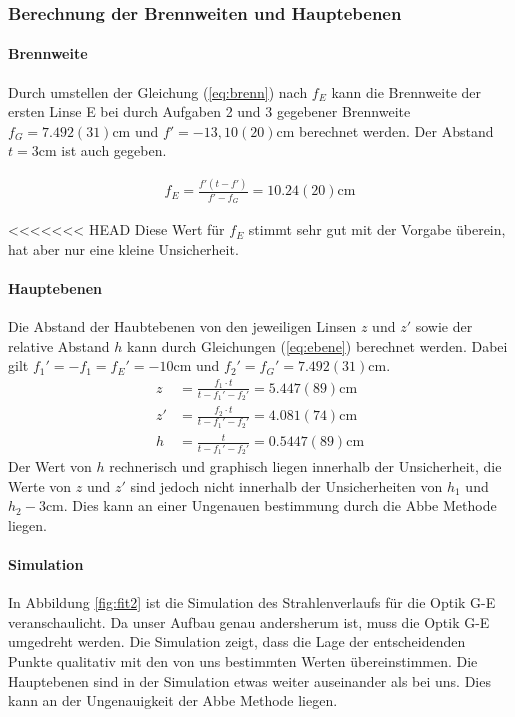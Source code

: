 \documentclass[11pt, a4paper]{article}
\begin{document}
    \subsubsection{Berechnung der Brennweiten und Hauptebenen}
    \paragraph{Brennweite}
    Durch umstellen der Gleichung (\ref{eq:brenn}) nach $f_E$ kann die Brennweite der ersten Linse E bei durch Aufgaben 2 und 3 gegebener Brennweite $f_G = 7.492(31) \si{\centi\metre}$ und $f' = - 13,10(20) \si{\centi\metre}$ berechnet werden. Der Abstand $t = 3 \si{\centi\metre}$ ist auch gegeben.

    \begin{align}
        f_E = \frac{f' \left(t - f'\right)}{f' - f_G} = 10.24(20) \si{\centi\metre}
    \end{align}

<<<<<<< HEAD
    Diese Wert für $f_E$ stimmt sehr gut mit der Vorgabe überein, hat aber nur eine kleine Unsicherheit.

    \paragraph{Hauptebenen}
    Die Abstand der Haubtebenen von den jeweiligen Linsen $z$ und $z'$ sowie der relative Abstand $h$ kann durch Gleichungen (\ref{eq:ebene}) berechnet werden. Dabei gilt $f_1' = -f_1 = f_E' = -10 \si{\centi\metre}$ und $f_2' = f_G' = 7.492(31) \si{\centi\metre}$.
    \begin{align}
        z &= \frac{f_1 \cdot t}{t - f_1' - f_2'} = 5.447(89) \si{\centi\metre} \\
        z' &= \frac{f_2 \cdot t}{t - f_1' - f_2'} = 4.081(74) \si{\centi\metre} \\
        h &= \frac{t}{t - f_1' - f_2'} = 0.5447(89) \si{\centi\metre}
    \end{align}
    Der Wert von $h$ rechnerisch und graphisch liegen innerhalb der Unsicherheit, die Werte von $z$ und $z'$ sind jedoch nicht innerhalb der Unsicherheiten von $h_1$ und $h_2 - 3 \si{\centi\metre}$. Dies kann an einer Ungenauen bestimmung durch die Abbe Methode liegen.

    \paragraph{Simulation}
    In Abbildung \ref{fig:fit2} ist die Simulation des Strahlenverlaufs für die Optik G-E veranschaulicht. Da unser Aufbau genau andersherum ist, muss die Optik G-E umgedreht werden. Die Simulation zeigt, dass die Lage der entscheidenden Punkte qualitativ mit den von uns bestimmten Werten übereinstimmen. Die Hauptebenen sind in der Simulation etwas weiter auseinander als bei uns. Dies kann an der Ungenauigkeit der Abbe Methode liegen.
\end{document}
